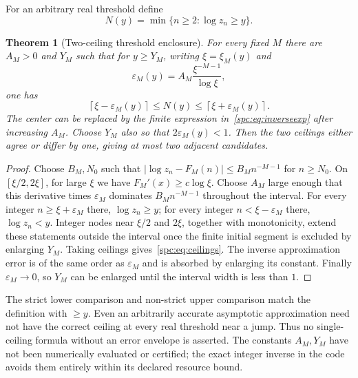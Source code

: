 \documentclass[11pt,letterpaper]{article}
\newtheorem{theorem}{Theorem}[section]
\theoremstyle{definition}\newtheorem{definition}[theorem]{Definition}
\theoremstyle{remark}\newtheorem{remark}[theorem]{Remark}
\begin{document}
For an arbitrary real threshold define
\[
 N(y)=\min\{n\ge2:\log z_n\ge y\}.
\]
\begin{theorem}[Two-ceiling threshold enclosure]\label{spc:thm:threshold}
For every fixed $M$ there are $A_M>0$ and $Y_M$ such that for $y\ge Y_M$, writing $\xi=\xi_M(y)$ and
\[
 \varepsilon_M(y)=A_M\frac{\xi^{-M-1}}{\log\xi},
\]
one has
\begin{equation}\label{spc:eq:ceilings}
 \left\lceil\xi-\varepsilon_M(y)\right\rceil
 \le N(y)\le
 \left\lceil\xi+\varepsilon_M(y)\right\rceil.
\end{equation}
The center can be replaced by the finite expression in~\eqref{spc:eq:inverseexp} after increasing $A_M$. Choose $Y_M$ also so that $2\varepsilon_M(y)<1$. Then the two ceilings either agree or differ by one, giving at most two adjacent candidates.
\end{theorem}
\begin{proof}
Choose $B_M,N_0$ such that
$|\log z_n-F_M(n)|\le B_Mn^{-M-1}$ for $n\ge N_0$. On $[\xi/2,2\xi]$, for large $\xi$ we have $F_M'(x)\ge c\log\xi$. Choose $A_M$ large enough that this derivative times $\varepsilon_M$ dominates $B_Mn^{-M-1}$ throughout the interval. For every integer $n\ge\xi+\varepsilon_M$ there, $\log z_n\ge y$; for every integer $n<\xi-\varepsilon_M$ there, $\log z_n<y$. Integer nodes near $\xi/2$ and $2\xi$, together with monotonicity, extend these statements outside the interval once the finite initial segment is excluded by enlarging $Y_M$. Taking ceilings gives~\eqref{spc:eq:ceilings}. The inverse approximation error is of the same order as $\varepsilon_M$ and is absorbed by enlarging its constant. Finally $\varepsilon_M\to0$, so $Y_M$ can be enlarged until the interval width is less than $1$.
\end{proof}
The strict lower comparison and non-strict upper comparison match the definition with $\ge y$. Even an arbitrarily accurate asymptotic approximation need not have the correct ceiling at every real threshold near a jump. Thus no single-ceiling formula without an error envelope is asserted. The constants $A_M,Y_M$ have not been numerically evaluated or certified; the exact integer inverse in the code avoids them entirely within its declared resource bound.
\end{document}
